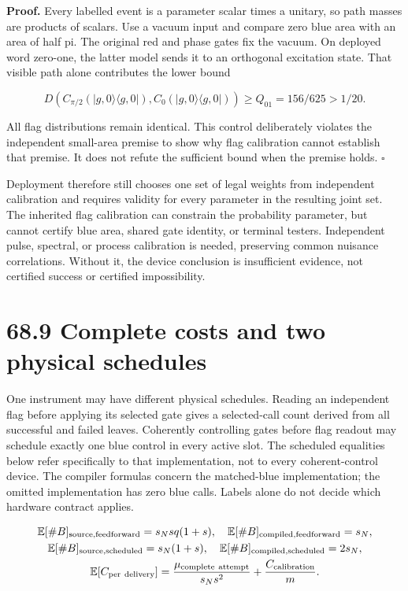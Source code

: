\documentclass[
  11pt,
  oneside]{book}
\begin{document}
\textbf{Proof.} Every labelled event is a parameter scalar times a
unitary, so path masses are products of scalars. Use a vacuum input and
compare zero blue area with an area of half pi. The original red and
phase gates fix the vacuum. On deployed word zero-one, the latter model
sends it to an orthogonal excitation state. That visible path alone
contributes the lower bound

\[
D(C_{\pi/2}(|g,0\rangle\langle g,0|),C_0(|g,0\rangle\langle g,0|))
\ge Q_{01}=156/625>1/20.
\]

All flag distributions remain identical. This control deliberately
violates the independent small-area premise to show why flag calibration
cannot establish that premise. It does not refute the sufficient bound
when the premise holds. \(\square\)

Deployment therefore still chooses one set of legal weights from
independent calibration and requires validity for every parameter in the
resulting joint set. The inherited flag calibration can constrain the
probability parameter, but cannot certify blue area, shared gate
identity, or terminal testers. Independent pulse, spectral, or process
calibration is needed, preserving common nuisance correlations. Without
it, the device conclusion is insufficient evidence, not certified
success or certified impossibility.

\section{68.9 Complete costs and two physical schedules}

One instrument may have different physical schedules. Reading an
independent flag before applying its selected gate gives a selected-call
count derived from all successful and failed leaves. Coherently
controlling gates before flag readout may schedule exactly one blue
control in every active slot. The scheduled equalities below refer
specifically to that implementation, not to every coherent-control
device. The compiler formulas concern the matched-blue implementation;
the omitted implementation has zero blue calls. Labels alone do not
decide which hardware contract applies.

\[
\begin{gathered}
\mathbb E[\#B]_{\rm source,feedforward}=s_Nsq(1+s),\quad
\mathbb E[\#B]_{\rm compiled,feedforward}=s_N,\\
\mathbb E[\#B]_{\rm source,scheduled}=s_N(1+s),\quad
\mathbb E[\#B]_{\rm compiled,scheduled}=2s_N,\\
\mathbb E[C_{\rm per\ delivery}]
=\frac{\mu_{\rm complete\ attempt}}{s_Ns^2}
+\frac{C_{\rm calibration}}{m}.
\end{gathered}
\]
\end{document}
